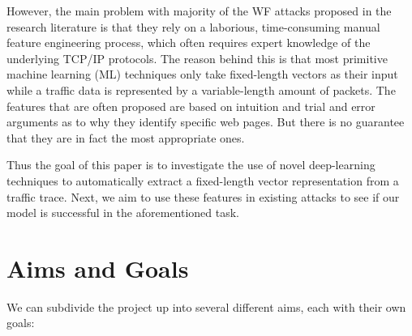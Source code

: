 However, the main problem with majority of the WF attacks proposed in the research literature is that they rely on a laborious,
time-consuming manual feature engineering process, which often requires expert knowledge of the underlying TCP/IP protocols.
The reason behind this is that most primitive machine learning (ML) techniques only take fixed-length vectors as their input while a traffic data is represented by a variable-length amount of packets.
The features that are often proposed are based on intuition and trial and error arguments as to why they identify specific web pages.
But there is no guarantee that they are in fact the most appropriate ones.

Thus the goal of this paper is to investigate the use of novel deep-learning techniques to automatically extract
a fixed-length vector representation from a traffic trace.
Next, we aim to use these features in existing attacks to see if our model is successful in the aforementioned task.

\newpage

\section{Aims and Goals}

We can subdivide the project up into several different aims, each with their own goals:

